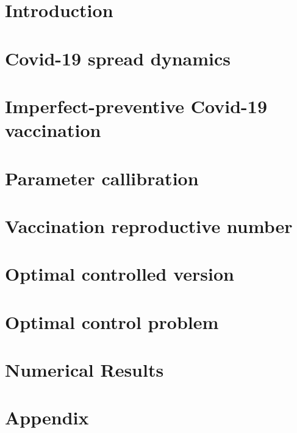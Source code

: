 \documentclass[5p, sort&compress]{elsarticle}
\begin{document}
  
  \section{Introduction}
    
  \section{Covid-19 spread dynamics}
    
  \section{Imperfect-preventive Covid-19 vaccination}
    
  \section{Parameter callibration}
    
  \section{Vaccination reproductive number}
  \section{Optimal controlled version}
    
  \section{Optimal control problem}
  \section{Numerical Results}   
  \appendix
  \section{Appendix}
    
  \nocite{*}
  
  
\end{document}

